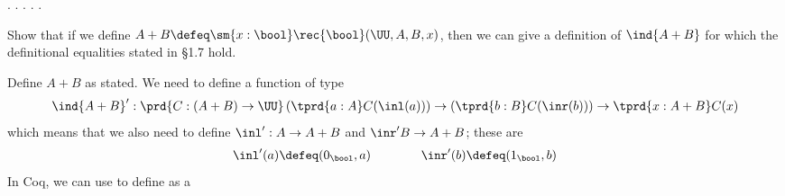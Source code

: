 \begin{coqdoccode}
\coqdocindent{2.00em}
.\coqdoceol
\coqdocindent{2.00em}
 . .\coqdoceol
\coqdocindent{1.00em}
.\coqdoceol
\coqdocemptyline
\coqdocnoindent
{} .\coqdoceol
\coqdocemptyline
\end{coqdoccode}
    Show that if we define $A + B \defeq \sm{x:\bool}
        \rec{\bool}(\UU, A, B, x)$, then we can give a definition of $\ind{A+B}$ for
        which the definitional equalities stated in \S1.7 hold.


    \soln  
    Define $A+B$ as stated.  We need to define a function of type
    \[
    \ind{A+B}' : \prd{C : (A + B) \to \UU}
    \left( \tprd{a:A} C(\inl(a))\right)
    \to
    \left( \tprd{b:B} C(\inr(b))\right)
    \to
    \tprd{x : A + B} C(x)
    \]
    which means that we also need to define $\inl' : A \to A + B$ and $\inr' B \to
    A + B$; these are
    \begin{align*}
    \inl'(a) \defeq (0_{\bool}, a)
    \qquad\qquad
    \inr'(b) \defeq (1_{\bool}, b)
    \end{align*}
In Coq, we can use  to define  as a

